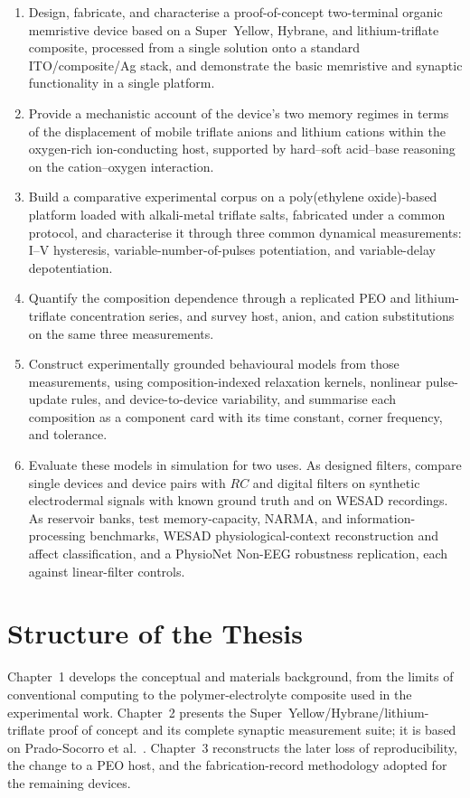 \documentclass[12pt, twoside]{report}
\begin{document}
\begin{enumerate}
  \item \label{subsec:objectives} Design, fabricate, and characterise a proof-of-concept two-terminal organic memristive device based on a Super~Yellow, Hybrane, and lithium-triflate composite, processed from a single solution onto a standard ITO/composite/Ag stack, and demonstrate the basic memristive and synaptic functionality in a single platform.
  \item Provide a mechanistic account of the device's two memory regimes in terms of the displacement of mobile triflate anions and lithium cations within the oxygen-rich ion-conducting host, supported by hard--soft acid--base reasoning on the cation--oxygen interaction.
  \item Build a comparative experimental corpus on a poly(ethylene oxide)-based platform loaded with alkali-metal triflate salts, fabricated under a common protocol, and characterise it through three common dynamical measurements: I--V hysteresis, variable-number-of-pulses potentiation, and variable-delay depotentiation.
  \item Quantify the composition dependence through a replicated PEO and lithium-triflate concentration series, and survey host, anion, and cation substitutions on the same three measurements.
  \item Construct experimentally grounded behavioural models from those measurements, using composition-indexed relaxation kernels, nonlinear pulse-update rules, and device-to-device variability, and summarise each composition as a component card with its time constant, corner frequency, and tolerance.
  \item Evaluate these models in simulation for two uses. As designed filters, compare single devices and device pairs with $RC$ and digital filters on synthetic electrodermal signals with known ground truth and on WESAD recordings. As reservoir banks, test memory-capacity, NARMA, and information-processing benchmarks, WESAD physiological-context reconstruction and affect classification, and a PhysioNet Non-EEG robustness replication, each against linear-filter controls.
\end{enumerate}

\section*{Structure of the Thesis}
\label{subsec:outline}

Chapter~1 develops the conceptual and materials background, from the limits of conventional computing to the polymer-electrolyte composite used in the experimental work. Chapter~2 presents the Super~Yellow/Hybrane/lithium-triflate proof of concept and its complete synaptic measurement suite; it is based on Prado-Socorro et al.~\cite{PradoSocorro2022}. Chapter~3 reconstructs the later loss of reproducibility, the change to a PEO host, and the fabrication-record methodology adopted for the remaining devices.
\end{document}
